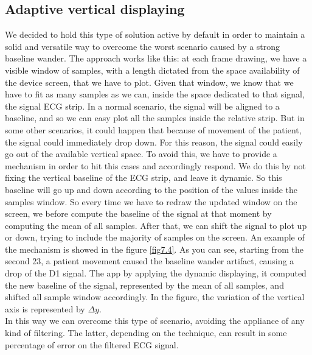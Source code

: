 \subsection{Adaptive vertical displaying}
We decided to hold this type of solution active by default in order to maintain a solid and versatile way to overcome the worst scenario caused by a strong baseline wander. The approach works like this: at each frame drawing, we have a visible window of samples, with a length dictated from the space availability of the device screen, that we have to plot. Given that window, we know that we have to fit as many samples as we can, inside the space dedicated to that signal, the signal ECG strip. In a normal scenario, the signal will be aligned to a baseline, and so we can easy plot all the samples inside the relative strip. But in some other scenarios, it could happen that because of movement of the patient, the signal could immediately drop down. For this reason, the signal could easily go out of the available vertical space. To avoid this, we have to provide a mechanism in order to hit this cases and accordingly respond. We do this by not fixing the vertical baseline of the ECG strip, and leave it dynamic. So this baseline will go up and down according to the position of the values inside the samples window. So every time we have to redraw the updated window on the screen, we before compute the baseline of the signal at that moment by computing the mean of all samples. After that, we can shift the signal to plot up or down, trying to include the majority of samples on the screen. An example of the mechanism is showed in the figure \ref{fig7.4}. As you can see, starting from the second 23, a patient movement caused the baseline wander artifact, causing a drop of the D1 signal. The app by applying the dynamic displaying, it computed the new baseline of the signal, represented by the mean of all samples, and shifted all sample window accordingly. In the figure, the variation of the vertical axis is represented by $\Delta y$.\\
In this way we can overcome this type of scenario, avoiding the appliance of any kind of filtering. The latter, depending on the technique, can result in some percentage of error on the filtered ECG signal.

